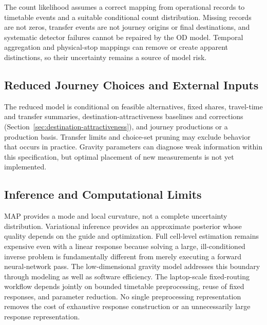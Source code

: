 The count likelihood assumes a correct mapping from operational records to
timetable events and a suitable conditional count distribution. Missing
records are not zeros, transfer events are not journey origins or final
destinations, and systematic detector failures cannot be repaired by the OD
model. Temporal aggregation and physical-stop mappings can remove or create
apparent distinctions, so their uncertainty remains a source of model risk.

\subsection{Reduced Journey Choices and External Inputs}

The reduced model is conditional on feasible alternatives, fixed shares,
travel-time and transfer summaries, destination-attractiveness baselines and
corrections (Section~\ref{sec:destination-attractiveness}), and journey
productions or a production basis. Transfer limits and choice-set pruning may
exclude behavior that occurs in practice. Gravity parameters can diagnose weak
information within this specification, but optimal placement of new
measurements is not yet implemented.

\subsection{Inference and Computational Limits}

MAP provides a mode and local curvature, not a complete uncertainty
distribution. Variational inference provides an approximate posterior whose
quality depends on the guide and optimization. Full cell-level estimation
remains expensive even with a linear response because solving a large,
ill-conditioned inverse problem is fundamentally different from merely
executing a forward neural-network pass. The low-dimensional gravity model
addresses this boundary through modeling as well as software efficiency.
The laptop-scale fixed-routing workflow depends jointly on bounded timetable
preprocessing, reuse of fixed responses, and parameter reduction. No single
preprocessing representation removes the cost of exhaustive response
construction or an unnecessarily large response representation.
